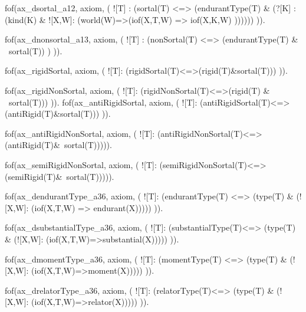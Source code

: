 fof(ax_dsortal_a12, axiom, (
    ![T] : (sortal(T) <=> (endurantType(T) &
                    (?[K] : (kind(K) & ![X,W]: (world(W)=>(iof(X,T,W) => iof(X,K,W) ))))))
    )).


fof(ax_dnonsortal_a13, axiom, (
    ![T] : (nonSortal(T) <=> (endurantType(T) & ~sortal(T)) )
    )).




fof(ax_rigidSortal, axiom, (
            ![T]: (rigidSortal(T)<=>(rigid(T)&sortal(T)))
        )).

fof(ax_rigidNonSortal, axiom, (
    ![T]: (rigidNonSortal(T)<=>(rigid(T) & ~sortal(T)))
                )).
fof(ax_antiRigidSortal, axiom, (
                    ![T]: (antiRigidSortal(T)<=>(antiRigid(T)&sortal(T)))
                                )).

fof(ax_antiRigidNonSortal, axiom, (
            ![T]: (antiRigidNonSortal(T)<=>(antiRigid(T)&~sortal(T))))).

fof(ax_semiRigidNonSortal, axiom, (
                        ![T]: (semiRigidNonSortal(T)<=>(semiRigid(T)&~sortal(T))))).







fof(ax_dendurantType_a36, axiom, (
      ![T]: (endurantType(T) <=> (type(T) & (![X,W]: (iof(X,T,W) => endurant(X)))))
      )).


fof(ax_dsubstantialType_a36, axiom, (
          ![T]: (substantialType(T)<=> (type(T) & (![X,W]: (iof(X,T,W)=>substantial(X)))))
      )).


fof(ax_dmomentType_a36, axiom, (
      ![T]: (momentType(T) <=> (type(T) & (![X,W]: (iof(X,T,W)=>moment(X)))))
      )).


  fof(ax_drelatorType_a36, axiom, (
          ![T]: (relatorType(T)<=> (type(T) & (![X,W]: (iof(X,T,W)=>relator(X)))))
      )).

